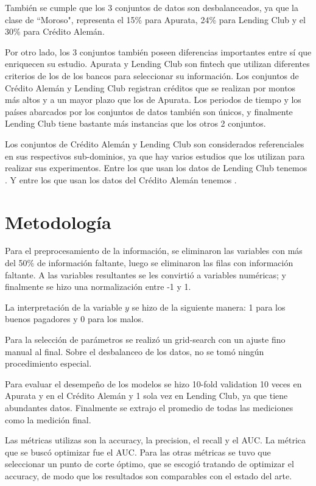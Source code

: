 También se cumple que los 3 conjuntos de datos son desbalanceados, ya que la clase de ``Moroso", representa el 15\% para Apurata, 24\% para Lending Club y el 30\% para Crédito Alemán.

Por otro lado, los 3 conjuntos también poseen diferencias importantes entre sí que enriquecen su estudio. Apurata y Lending Club son fintech que utilizan diferentes criterios de los de los bancos para seleccionar su información. Los conjuntos de Crédito Alemán y Lending Club registran créditos que se realizan por montos más altos y a un mayor plazo que los de Apurata. Los periodos de tiempo y los países abarcados por los conjuntos de datos también son únicos, y finalmente Lending Club tiene bastante más instancias que los otros 2 conjuntos.

Los conjuntos de Crédito Alemán y Lending Club son considerados referenciales en sus respectivos sub-dominios, ya que hay varios estudios que los utilizan para realizar sus experimentos. Entre los que usan los datos de Lending Club tenemos \cite{malekipirbazari2015risk, zhang2016research, zang2014credit, tan2018deep}. Y entre los que usan los datos del Crédito Alemán tenemos \cite{harris2015credit, nanni2009experimental, brown2012experimental, wang2012two}.

\section{Metodología}

Para el preprocesamiento de la información, se eliminaron las variables con más del 50\% de información faltante, luego se eliminaron las filas con información faltante. A las variables resultantes se les convirtió a variables numéricas; y finalmente se hizo una normalización entre -1 y 1.

La interpretación de la variable $y$ se hizo de la siguiente manera: 1 para los buenos pagadores y 0 para los malos.

Para la selección de parámetros se realizó un grid-search con un ajuste fino manual al final. Sobre el desbalanceo de los datos, no se tomó ningún procedimiento especial. 

Para evaluar el desempeño de los modelos se hizo 10-fold validation 10 veces en Apurata y en el Crédito Alemán y 1 sola vez en Lending Club, ya que tiene abundantes datos. Finalmente se extrajo el promedio de todas las mediciones como la medición final. 

Las métricas utilizas son la accuracy, la precision, el recall y el AUC. La métrica que se buscó optimizar fue el AUC. Para las otras métricas se tuvo que seleccionar un punto de corte óptimo, que se escogió tratando de optimizar el accuracy, de modo que los resultados son comparables con el estado del arte.

